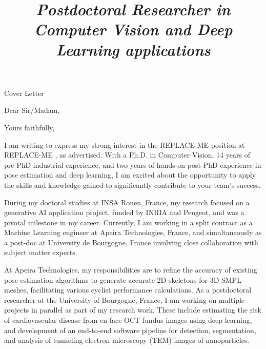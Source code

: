 \documentclass[11pt, a4paper, sans, final]{moderncv}
\title{\emph{Postdoctoral Researcher in Computer Vision and \newline Deep Learning applications}}
\begin{document}
\newcommand{\jobTitle}{REPLACE-ME }
\newcommand{\companyName}{REPLACE-ME }

{\Huge Cover Letter \par}    %
\recipient{\companyName}{Street address\\Zip Code City}  %
\opening{Dear Sir/Madam,}
\closing{ \bigskip Yours faithfully,}
\makelettertitle                       %
I am writing to express my strong interest in the \jobTitle position at \companyName,  %
as advertised.
With a Ph.D. in Computer Vision, 14 years of pre-PhD industrial experience, and two years of hands-on post-PhD experience in pose estimation and deep learning, I am excited about the opportunity to apply the skills and knowledge gained to significantly contribute to your team's success.

During my doctoral studies at INSA Rouen, France, my research focused on a generative AI application project, funded by INRIA and Peugeot, and was a pivotal milestone in my career. 
Currently, I am working in a split contract as a Machine Learning engineer at Apeira Technologies, France, and simultaneously as a post-doc at University de Bourgogne, France involving close collaboration with subject matter experts.

At Apeira Technologies, my responsibilities are to refine the accuracy of existing pose estimation algorithms to generate accurate 2D skeletons for 3D SMPL meshes, facilitating various cyclist performance calculations.
As a postdoctoral researcher at the University of Bourgogne, France, I am working on multiple projects in parallel as part of my research work. These include estimating the risk of cardiovascular disease from en-face OCT fundus images using deep learning, and development of an end-to-end software pipeline for detection, segmentation, and analysis of tunneling electron microscopy (TEM) images of nanoparticles.  
\end{document}
